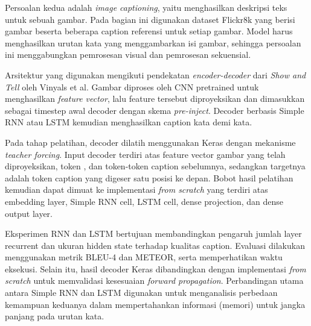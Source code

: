 Persoalan kedua adalah \textit{image captioning}, yaitu menghasilkan deskripsi
teks untuk sebuah gambar. Pada bagian ini digunakan dataset Flickr8k yang berisi
gambar beserta beberapa caption referensi untuk setiap gambar. Model harus
menghasilkan urutan kata yang menggambarkan isi gambar, sehingga persoalan ini
menggabungkan pemrosesan visual dan pemrosesan sekuensial.

Arsitektur yang digunakan mengikuti pendekatan \textit{encoder-decoder} dari
\textit{Show and Tell} oleh Vinyals et al. Gambar diproses oleh CNN pretrained
untuk menghasilkan \textit{feature vector}, lalu feature tersebut diproyeksikan
dan dimasukkan sebagai timestep awal decoder dengan skema \textit{pre-inject}.
Decoder berbasis Simple RNN atau LSTM kemudian menghasilkan caption kata demi
kata.

Pada tahap pelatihan, decoder dilatih menggunakan Keras dengan mekanisme
\textit{teacher forcing}. Input decoder terdiri atas feature vector gambar yang
telah diproyeksikan, token , dan token-token caption sebelumnya,
sedangkan targetnya adalah token caption yang digeser satu posisi ke depan.
Bobot hasil pelatihan kemudian dapat dimuat ke implementasi \textit{from scratch}
yang terdiri atas embedding layer, Simple RNN cell, LSTM cell, dense projection,
dan dense output layer.

Eksperimen RNN dan LSTM bertujuan membandingkan pengaruh jumlah layer recurrent
dan ukuran hidden state terhadap kualitas caption. Evaluasi dilakukan
menggunakan metrik BLEU-4 dan METEOR, serta memperhatikan waktu eksekusi. Selain
itu, hasil decoder Keras dibandingkan dengan implementasi \textit{from scratch}
untuk memvalidasi kesesuaian \textit{forward propagation}. Perbandingan utama
antara Simple RNN dan LSTM digunakan untuk menganalisis perbedaan kemampuan
keduanya dalam mempertahankan informasi (memori) untuk jangka panjang pada urutan kata.
